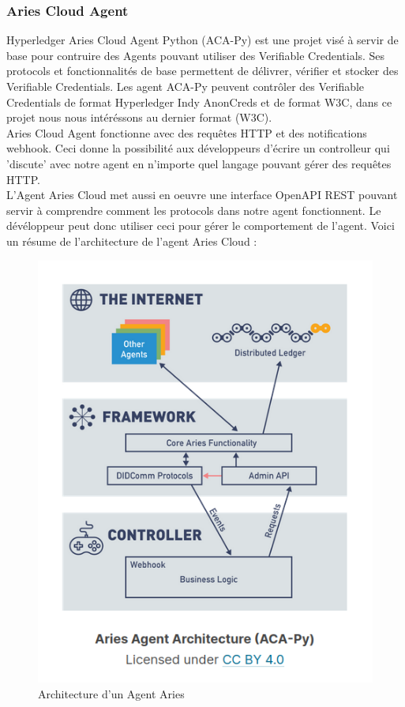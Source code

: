 \documentclass[12pt, openany]{report}
\begin{document}
\subsubsection{Aries Cloud Agent}
\noindent 
\begin{flushleft}
Hyperledger Aries Cloud Agent Python (ACA-Py) est une projet visé à servir de base pour contruire des Agents pouvant utiliser des Verifiable Credentials. Ses protocols et fonctionnalités de base permettent de délivrer, vérifier et stocker des Verifiable Credentials. Les agent ACA-Py peuvent contrôler des Verifiable Credentials de format Hyperledger Indy AnonCreds et de format W3C, dans ce projet nous nous intéréssons au dernier format (W3C). \\
Aries Cloud Agent fonctionne avec des requêtes HTTP et des notifications webhook. Ceci donne la possibilité aux développeurs d'écrire un controlleur qui 'discute' avec notre agent en n'importe quel langage pouvant gérer des requêtes HTTP. \\
L'Agent Aries Cloud met aussi en oeuvre une interface  OpenAPI REST pouvant servir à comprendre comment les protocols dans notre agent fonctionnent. Le dévéloppeur peut donc utiliser ceci pour gérer le comportement de l'agent. Voici un résume de l'architecture de l'agent Aries Cloud : \\

\begin{figure}[h]
\includegraphics[scale=0.6]{ACA-py.png}
\centering
\caption{Architecture d'un Agent Aries}
\end{figure}
\end{flushleft}
\end{document}

